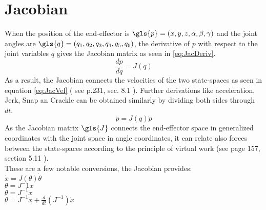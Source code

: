 \section{Jacobian} \label{sec:Jacobian}
When the position of the end-effector is $\gls{p}=(x,y,z,\alpha,\beta,\gamma)$ and the joint angles are  $\gls{q}=(q_1, q_2, q_3, q_4, q_5, q_6)$, the derivative of $p$ with respect to the joint variables $q$ gives the Jacobian matrix as seen in  \cref{eq:JacDeriv}.\\
\begin{equation} \label{eq:JacDeriv}
	\frac{dp}{dq}=J(q)
\end{equation}
\medskip
As a result, the Jacobian connects the velocities of the two state-spaces as seen in equation \ref{eq:JacVel} ( see \cite{CorkeRoboticVisionControl} p.231, sec. 8.1 ). Further derivations like acceleration, Jerk, Snap an Crackle can be obtained similarly by dividing both sides through $dt$. \\
\begin{equation}\label{eq:JacVel}
	\dot{p}=J(q)\dot{p}
\end{equation}
As the Jacobian matrix $\gls{J}$ connects the end-effector space in generalized coordinates with the joint space in angle coordinates, it can relate also forces between the state-spaces according to the principle of virtual work (see \cite{IndustrialRobotArm} page 157, section 5.11 ).\\
These are a few notable conversions, the Jacobian provides:\\
$ \dot{x}=J(\theta)\dot{\theta} $ \\
$ \theta=J{^-1}x $ \\
$ \dot{\theta} = J^{-1} \dot{x} $\\
$ \ddot{\theta} = J^{-1} \ddot{x} + \frac{d}{dt}(J^{-1}) \dot{x} $\\

